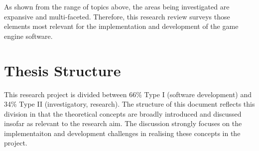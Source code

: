 \documentclass[11pt, a4paper, oneside]{report} %
\begin{document}









As shown from the range of topics above, the areas being investigated are
expansive and multi-faceted. Therefore, this research review surveys those
elements most relevant for the implementation and development of the game engine
software.

\section{Thesis Structure}

This research project is divided between 66\% Type I (software development) and
34\% Type II (investigatory, research). The structure of this document reflects
this division in that the theoretical concepts are broadly introduced and
discussed insofar as relevant to the research aim. The discussion strongly
focuses on the  implementaiton and development challenges in realising these
concepts in the project.
\end{document}
